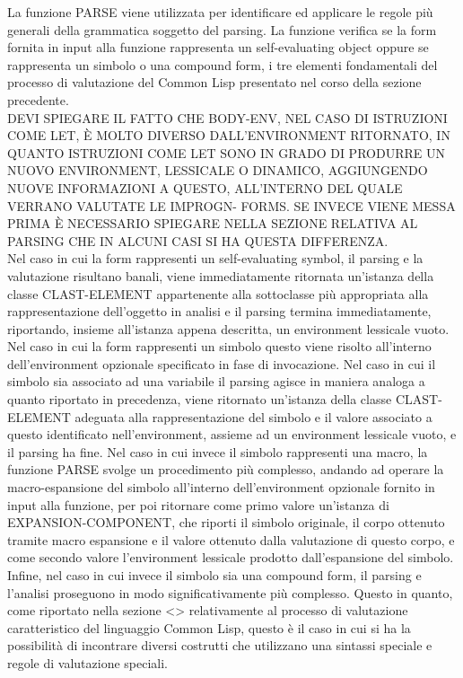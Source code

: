 La funzione PARSE viene utilizzata per identificare ed applicare le regole più
generali della grammatica soggetto del parsing. La funzione verifica se la
form fornita in input alla funzione rappresenta un self-evaluating object
oppure se rappresenta un simbolo o una compound form, i tre elementi
fondamentali del processo di valutazione del Common Lisp presentato nel corso
della sezione precedente.\\

DEVI SPIEGARE IL FATTO CHE BODY-ENV, NEL CASO DI ISTRUZIONI COME LET, È MOLTO
DIVERSO DALL’ENVIRONMENT RITORNATO, IN QUANTO ISTRUZIONI COME LET SONO IN
GRADO DI PRODURRE UN NUOVO ENVIRONMENT, LESSICALE O DINAMICO, AGGIUNGENDO
NUOVE INFORMAZIONI A QUESTO, ALL’INTERNO DEL QUALE VERRANO VALUTATE LE
IMPROGN- FORMS. SE INVECE VIENE MESSA PRIMA È NECESSARIO SPIEGARE NELLA
SEZIONE RELATIVA AL PARSING CHE IN ALCUNI CASI SI HA QUESTA DIFFERENZA.\\

Nel caso in cui la form rappresenti un self-evaluating symbol, il parsing e la
valutazione risultano banali, viene immediatamente ritornata un’istanza della
classe CLAST-ELEMENT appartenente alla sottoclasse più appropriata alla
rappresentazione dell’oggetto in analisi e il parsing termina immediatamente,
riportando, insieme all’istanza appena descritta, un environment lessicale
vuoto.\\

Nel caso in cui la form rappresenti un simbolo questo viene risolto
all’interno dell’environment opzionale specificato in fase di invocazione. Nel
caso in cui il simbolo sia associato ad una variabile il parsing agisce in
maniera analoga a quanto riportato in precedenza, viene ritornato un’istanza
della classe CLAST-ELEMENT adeguata alla rappresentazione del simbolo e il
valore associato a questo identificato nell’environment, assieme ad un
environment lessicale vuoto, e il parsing ha fine. Nel caso in cui invece il
simbolo rappresenti una macro, la funzione PARSE svolge un procedimento più
complesso, andando ad operare la macro-espansione del simbolo all’interno
dell’environment opzionale fornito in input alla funzione, per poi ritornare
come primo valore un’istanza di EXPANSION-COMPONENT, che riporti il simbolo
originale, il corpo ottenuto tramite macro espansione e il valore ottenuto
dalla valutazione di questo corpo, e come secondo valore l’environment
lessicale prodotto dall’espansione del simbolo.\\

Infine, nel caso in cui invece il simbolo sia una compound form, il parsing e
l’analisi proseguono in modo significativamente più complesso. Questo in
quanto, come riportato nella sezione <> relativamente al processo di
valutazione caratteristico del linguaggio Common Lisp, questo è il caso in cui
si ha la possibilità di incontrare diversi costrutti che utilizzano una
sintassi speciale e regole di valutazione speciali.\\

